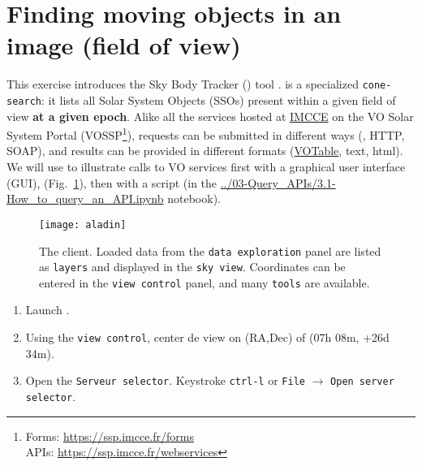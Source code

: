 \section{Finding moving objects in an image (field of view)}
\setcounter{questions}{1}


  This exercise introduces the Sky Body Tracker (\skybot) tool
  \citep{2006-ASPC-351-Berthier}.
  \skybot is a specialized \texttt{cone-search}: it lists
  all Solar System Objects (SSOs) present within
  a given field of view \textbf{at a given epoch}.
  Alike all the services hosted at
  \href{https://www.imcce.fr}{IMCCE}
  on the VO Solar System Portal
  (VOSSP\footnote{Forms: \href{https://ssp.imcce.fr/forms}{https://ssp.imcce.fr/forms}\\
  \hspace*{1.8em}APIs: \href{https://ssp.imcce.fr/webservices}{https://ssp.imcce.fr/webservices}}),
  \skybot requests
  can be submitted in different ways
  (\aladin, HTTP, SOAP), and results can be provided in different 
  formats (\href{https://www.ivoa.net/documents/VOTable/}{VOTable}, text, html).\\

  We will use \skybot to illustrate calls to VO services first with
  a graphical user interface (GUI), \aladin (Fig.~\ref{fig:aladin}), then 
  with a \python script (in the \url{../03-Query_APIs/3.1-How_to_query_an_API.ipynb} notebook).


\begin{figure}[ht]
  \centering
  \texttt{[image: aladin]}
  \caption{The \aladin client. Loaded data from the
  \texttt{data exploration} panel are listed as
  \texttt{layers} and displayed in the  
  \texttt{sky view}. Coordinates can be entered in the
  \texttt{view control} panel, and many
  \texttt{tools} are available.
  }
  \label{fig:aladin}
\end{figure}

\newpage
  \begin{enumerate}
    \setlength\itemsep{0em}
    \item Launch \aladin.

    \item Using the \texttt{view control}, center de view on (RA,Dec) of (07h 08m, +26d 34m).

    \item Open the \texttt{Serveur selector}. Keystroke \texttt{ctrl-l} or \texttt{File} 
      $\rightarrow$ \texttt{Open server selector}.
  \end{enumerate}
  \setcounter{saveitem}{\value{enumi}}  

